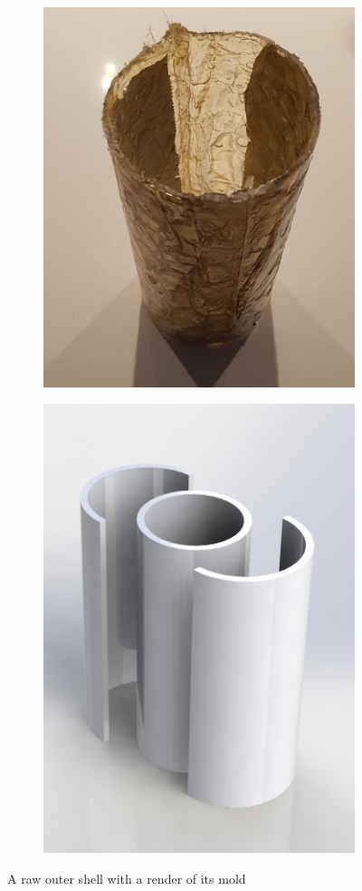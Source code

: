 \documentclass[]{report}
\begin{document}
\begin{figure}
	\centering
	\begin{subfigure}{.5\textwidth}
		\centering
		\includegraphics[width=.8\linewidth]{rawshell.jpg}
	\end{subfigure}%
	\begin{subfigure}{.5\textwidth}
		\centering
		\includegraphics[width=0.7\linewidth, angle=0]{Mold_render.jpg}
	\end{subfigure}
	\caption{A raw outer shell with a render of its mold}
	\label{shellmold}
\end{figure}
\end{document}
